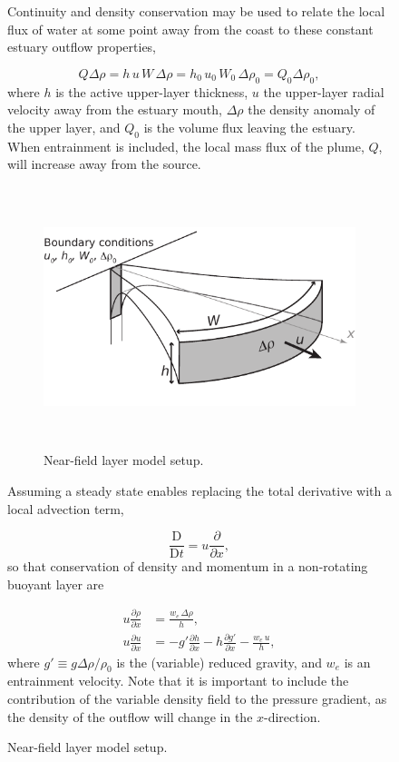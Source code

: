 \documentclass[11pt]{report}
\numberwithin{equation}{section}
\begin{document}
\begin{figure}
Continuity and density conservation may be used to relate the local flux of water at some point away from the coast to these constant estuary outflow properties,

\begin{equation}
Q \Delta\rho = h\,u\,W\,\Delta\rho = h_0\,u_0\,W_0\,\Delta\rho_0 = Q_0 \Delta\rho_0, \label{eq:mass}
\end{equation}
where $h$ is the active upper-layer thickness, $u$ the upper-layer radial velocity away from the estuary mouth, $\Delta\rho$ the density anomaly of the upper layer, and $Q_0$ is the volume flux leaving the estuary.  When entrainment is included, the local mass flux of the plume, $Q$, will increase away from the source.

\begin{figure}[htbp]
    \centering
        \includegraphics[height=3in]{layer_model_setup.pdf}
    \caption{Near-field layer model setup.}
    \label{fig:layer_model_setup}
\end{figure}

Assuming a steady state enables replacing the total derivative with a local advection term,

\begin{equation}
\frac{\mathrm{D}}{\mathrm{D} t} = u\frac{\partial}{\partial x},
\end{equation}
so that conservation of density and momentum in a non-rotating buoyant layer are

\begin{align}
u \frac{\partial \rho}{\partial x} &= \frac{w_e\,\Delta\rho}{h}, \label{eq:moment_full}\\
u \frac{\partial u}{\partial x} &=  -g' \frac{\partial h}{\partial x} - h \frac{\partial g'}{\partial x}- \frac{w_e\,u}{h}, \label{eq:density_full}
\end{align}
where $g' \equiv g \Delta\rho / \rho_0$ is the (variable) reduced gravity, and $w_e$ is an entrainment velocity.  Note that it is important to include the contribution of the variable density field to the pressure gradient, as the density of the outflow will change in the $x$-direction.  


\end{figure}
\end{document}
